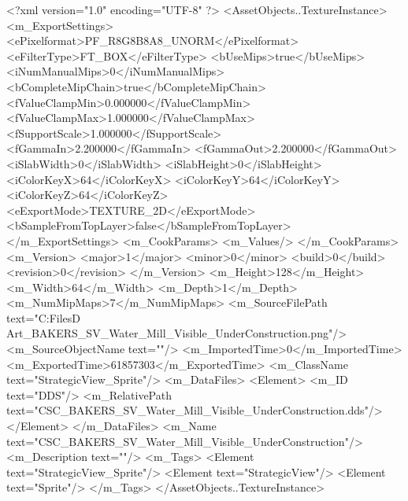 <?xml version="1.0" encoding="UTF-8" ?>
<AssetObjects..TextureInstance>
	<m_ExportSettings>
		<ePixelformat>PF_R8G8B8A8_UNORM</ePixelformat>
		<eFilterType>FT_BOX</eFilterType>
		<bUseMips>true</bUseMips>
		<iNumManualMips>0</iNumManualMips>
		<bCompleteMipChain>true</bCompleteMipChain>
		<fValueClampMin>0.000000</fValueClampMin>
		<fValueClampMax>1.000000</fValueClampMax>
		<fSupportScale>1.000000</fSupportScale>
		<fGammaIn>2.200000</fGammaIn>
		<fGammaOut>2.200000</fGammaOut>
		<iSlabWidth>0</iSlabWidth>
		<iSlabHeight>0</iSlabHeight>
		<iColorKeyX>64</iColorKeyX>
		<iColorKeyY>64</iColorKeyY>
		<iColorKeyZ>64</iColorKeyZ>
		<eExportMode>TEXTURE_2D</eExportMode>
		<bSampleFromTopLayer>false</bSampleFromTopLayer>
	</m_ExportSettings>
	<m_CookParams>
		<m_Values/>
	</m_CookParams>
	<m_Version>
		<major>1</major>
		<minor>0</minor>
		<build>0</build>
		<revision>0</revision>
	</m_Version>
	<m_Height>128</m_Height>
	<m_Width>64</m_Width>
	<m_Depth>1</m_Depth>
	<m_NumMipMaps>7</m_NumMipMaps>
	<m_SourceFilePath text="C:\Users\Shadow\Desktop\Working Files\2D Art\Quarters\Bakers\StrategicView\CSC_BAKERS_SV_Water_Mill_Visible_UnderConstruction.png"/>
	<m_SourceObjectName text=""/>
	<m_ImportedTime>0</m_ImportedTime>
	<m_ExportedTime>61857303</m_ExportedTime>
	<m_ClassName text="StrategicView_Sprite"/>
	<m_DataFiles>
		<Element>
			<m_ID text="DDS"/>
			<m_RelativePath text="CSC_BAKERS_SV_Water_Mill_Visible_UnderConstruction.dds"/>
		</Element>
	</m_DataFiles>
	<m_Name text="CSC_BAKERS_SV_Water_Mill_Visible_UnderConstruction"/>
	<m_Description text=""/>
	<m_Tags>
		<Element text="StrategicView_Sprite"/>
		<Element text="StrategicView"/>
		<Element text="Sprite"/>
	</m_Tags>
</AssetObjects..TextureInstance>

